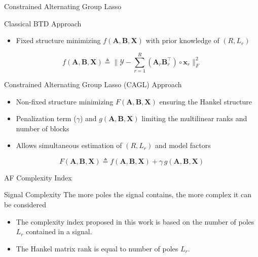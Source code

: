 \documentclass{beamer}
\begin{document}
	\begin{frame}{Constrained Alternating Group Lasso}
		
		\begin{block}{Classical BTD Approach}
			\begin{itemize}
				\item Fixed structure minimizing $f(\textbf{A}, \textbf{B}, \textbf{X})$ with prior knowledge of $(R,L_{r})$
			\end{itemize}
		\end{block}
		\begin{equation}
			f(\textbf{A}, \textbf{B}, \textbf{X}) \triangleq
			 \Big\| {\mathcal{Y}} - \textstyle \sum_{r = 1}^{R} \left( \textbf{A}_r \textbf{B}_r^{\top} \right) \circ \textbf{x}_r  \Big\|_F^2
		\end{equation}
		\begin{block}{Constrained Alternating Group Lasso (CAGL) Approach}
			\begin{itemize}
				\item Non-fixed structure minimizing $F(\textbf{A},\textbf{B},\textbf{X})$ ensuring the Hankel structure
				\item Penalization term ($\gamma$) and $g({\textbf{A}, \textbf{B}, \textbf{X}})$ limiting the multilinear ranks and number of blocks
				\item Allows simultaneous estimation of $(R,L_{r})$ and model factors
			\end{itemize}
		\end{block}
		\begin{equation}
				  F({\textbf{A}, \textbf{B}, \textbf{X}})
				 \triangleq  
				 f({\textbf{A}, \textbf{B}, \textbf{X}}) + \gamma \, g({\textbf{A}, \textbf{B}, \textbf{X}})
		\end{equation}
	\end{frame}
	
	\begin{frame}{AF Complexity Index}
		
		\begin{block}{Signal Complexity}
			The more poles the signal contains, the more complex it can be considered
		\end{block}
		
		\begin{itemize}
			\item The complexity index proposed in this work is based on the number of poles $L_{r}$ contained in a signal. 
			\item The Hankel matrix rank is equal to number of poles $L_{r}$.
		\end{itemize}

	\end{frame}
	
\end{document}
